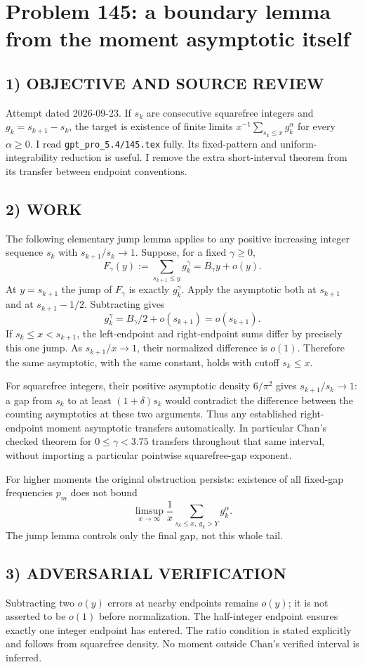 \section{Problem 145: a boundary lemma from the moment asymptotic itself}
\subsection*{1) OBJECTIVE AND SOURCE REVIEW}
Attempt dated 2026-09-23. If $s_k$ are consecutive squarefree integers and $g_k=s_{k+1}-s_k$, the target is existence of finite limits $x^{-1}\sum_{s_k\le x}g_k^\alpha$ for every $\alpha\ge0$. I read \texttt{gpt\_pro\_5.4/145.tex} fully. Its fixed-pattern and uniform-integrability reduction is useful. I remove the extra short-interval theorem from its transfer between endpoint conventions.
\subsection*{2) WORK}
The following elementary jump lemma applies to any positive increasing integer sequence $s_k$ with $s_{k+1}/s_k\to1$. Suppose, for a fixed $\gamma\ge0$,
\[
F_\gamma(y):=\sum_{s_{k+1}\le y}g_k^\gamma=B_\gamma y+o(y).
\]
At $y=s_{k+1}$ the jump of $F_\gamma$ is exactly $g_k^\gamma$. Apply the asymptotic both at $s_{k+1}$ and at $s_{k+1}-1/2$. Subtracting gives
\[
g_k^\gamma=B_\gamma/2+o(s_{k+1})=o(s_{k+1}).
\]
If $s_k\le x<s_{k+1}$, the left-endpoint and right-endpoint sums differ by precisely this one jump. As $s_{k+1}/x\to1$, their normalized difference is $o(1)$. Therefore the same asymptotic, with the same constant, holds with cutoff $s_k\le x$.

For squarefree integers, their positive asymptotic density $6/\pi^2$ gives $s_{k+1}/s_k\to1$: a gap from $s_k$ to at least $(1+\delta)s_k$ would contradict the difference between the counting asymptotics at these two arguments. Thus any established right-endpoint moment asymptotic transfers automatically. In particular Chan's checked theorem for $0\le\gamma<3.75$ transfers throughout that same interval, without importing a particular pointwise squarefree-gap exponent.

For higher moments the original obstruction persists: existence of all fixed-gap frequencies $p_m$ does not bound
\[
\limsup_{x\to\infty}\frac1x\sum_{s_k\le x,\ g_k>Y}g_k^\alpha.
\]
The jump lemma controls only the final gap, not this whole tail.
\subsection*{3) ADVERSARIAL VERIFICATION}
Subtracting two $o(y)$ errors at nearby endpoints remains $o(y)$; it is not asserted to be $o(1)$ before normalization. The half-integer endpoint ensures exactly one integer endpoint has entered. The ratio condition is stated explicitly and follows from squarefree density. No moment outside Chan's verified interval is inferred.
